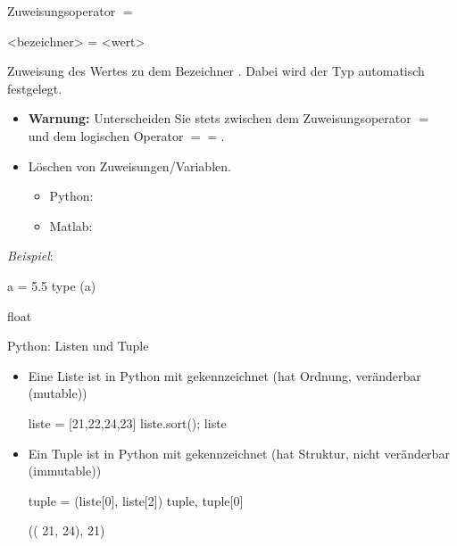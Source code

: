 \documentclass[hyperref={xetex}]{beamer}
\begin{document}
\begin{frame}[fragile]{Zuweisungsoperator $=$}
    \begin{pyin}
<bezeichner> = <wert>
    \end{pyin}   
Zuweisung des Wertes  zu dem Bezeichner . Dabei wird der Typ automatisch festgelegt.
\begin{itemize}
\item \textbf{Warnung:} Unterscheiden Sie  stets zwischen dem Zuweisungsoperator {\color{blue} $=$} und
dem logischen Operator {\color{blue} $==$}.   
\item Löschen von Zuweisungen/Variablen.
\begin{itemize}
\item Python: {\color{blue} }
\item Matlab: {\color{blue} }
\end{itemize}
\end{itemize}

\textsl{Beispiel}:

\begin{pyin}
  a = 5.5
  type (a)
\end{pyin}
\begin{pyout}
  float
\end{pyout}

\end{frame}

\begin{frame}[fragile]{Python: Listen und Tuple}
 \begin{itemize}
\item Eine \alert{Liste} ist in Python mit \isage{[..,..]} gekennzeichnet (hat Ordnung, veränderbar (mutable)) 
\begin{pyin}
liste = [21,22,24,23]
liste.sort(); liste 
\end{pyin}
\begin{pyout}
 [21, 22, 23, 24]
\end{pyout}
\item Ein \alert{Tuple} ist in Python mit  gekennzeichnet (hat Struktur, nicht veränderbar (immutable))
\begin{pyin}
tuple = (liste[0], liste[2])
tuple, tuple[0]
\end{pyin}
\begin{pyout}
(( 21, 24), 21) 
\end{pyout}
 \end{itemize}
\end{frame}
\end{document}
